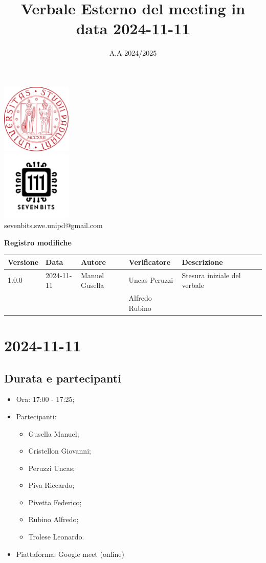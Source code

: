 \documentclass[12pt]{article}
\title{Verbale Esterno del meeting in data 2024-11-11}
\date{A.A 2024/2025}
\begin{document}
\maketitle
\begin{center}
\includegraphics[width=0.25\textwidth]{LogoUnipd}\\
\includegraphics[width=0.25\textwidth]{Sevenbitslogo}\\
sevenbits.swe.unipd@gmail.com\\
\vspace{2mm}

\textbf{Registro modifiche}\\
\vspace{2mm}
\begin{tabular}{|l|l|l|l|l|l|}
\hline
\textbf{Versione} & \textbf{Data} & \textbf{Autore} & \textbf{Verificatore} & \textbf{Descrizione} \\
\hline
1.0.0 & 2024-11-11 & Manuel Gusella & Uncas Peruzzi & Stesura iniziale del verbale\\
& & & Alfredo Rubino &\\
\hline
\end{tabular}
\end{center}
\newpage
\tableofcontents
\newpage
\section{2024-11-11}
\subsection{Durata e partecipanti}
\begin{itemize}
\item Ora: 17:00 - 17:25;
\item Partecipanti: 	
	\begin{itemize}
	\item Gusella Manuel;
	\item Cristellon Giovanni;
	\item Peruzzi Uncas;
	\item Piva Riccardo;
	\item Pivetta Federico;
	\item Rubino Alfredo;
	\item Trolese Leonardo.
	\end{itemize}
\item Piattaforma: Google meet (online)
\end{itemize}
\end{document}
